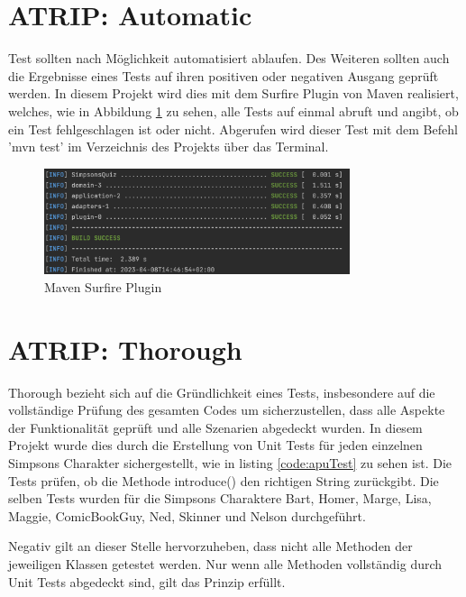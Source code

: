 \section{ATRIP: Automatic}
Test sollten nach Möglichkeit automatisiert ablaufen. Des Weiteren sollten auch die Ergebnisse eines Tests auf ihren positiven oder negativen Ausgang geprüft werden. In diesem Projekt wird dies mit dem Surfire Plugin von Maven realisiert, welches, wie in Abbildung \ref{fig:surefire} zu sehen, alle Tests auf einmal abruft und angibt, ob ein Test fehlgeschlagen ist oder nicht. Abgerufen wird dieser Test mit dem Befehl 'mvn test' im Verzeichnis des Projekts über das Terminal.
\begin{figure}[ht]
    \centering
    \includegraphics[width=0.8\textwidth]{Bilder/tests.png}
    \caption{Maven Surfire Plugin}
    \label{fig:surefire}
\end{figure}
\newpage

\section{ATRIP: Thorough}
Thorough bezieht sich auf die Gründlichkeit eines Tests, insbesondere auf die vollständige Prüfung des gesamten Codes um sicherzustellen, dass alle Aspekte der Funktionalität geprüft und alle Szenarien abgedeckt wurden. In diesem Projekt wurde dies durch die Erstellung von Unit Tests für jeden einzelnen Simpsons Charakter sichergestellt, wie in listing \ref{code:apuTest} zu sehen ist. Die Tests prüfen, ob die Methode introduce() den richtigen String zurückgibt. Die selben Tests wurden für die Simpsons Charaktere Bart, Homer, Marge, Lisa, Maggie, ComicBookGuy, Ned, Skinner und Nelson durchgeführt.


Negativ gilt an dieser Stelle hervorzuheben, dass nicht alle Methoden der jeweiligen Klassen getestet werden. Nur wenn alle Methoden vollständig durch Unit Tests abgedeckt sind, gilt das Prinzip erfüllt.  
